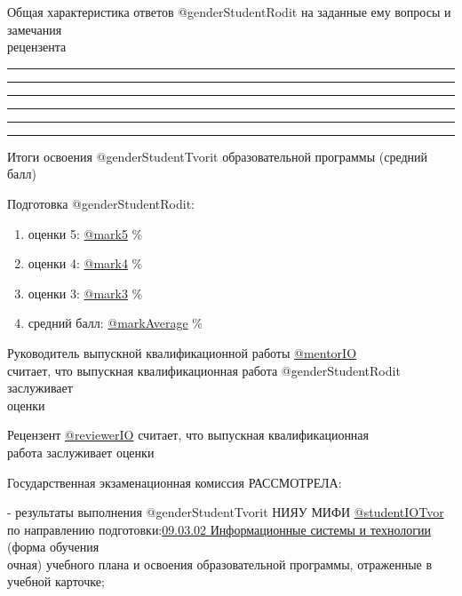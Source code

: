 \documentclass[a4paper,12pt]{article} %
\begin{document}
	Общая характеристика ответов @genderStudentRodit на заданные ему вопросы и замечания\\ рецензента  
	\vspace{0.4cm}
	\smallskip\hrule
	\vspace{0.4cm} 
	\smallskip\hrule
	\vspace{0.4cm} 
	\smallskip\hrule
	\vspace{0.4cm} 
	\smallskip\hrule
	\vspace{0.4cm} 
	\smallskip\hrule
	\vspace{0.4cm} 
	\smallskip\hrule
	\vspace{0.4cm} 

\par\medskip
Итоги освоения @genderStudentTvorit образовательной программы (средний балл)

Подготовка @genderStudentRodit:
\vspace{-0.2cm}
\begin{enumerate}
	\item оценки 5: \underline{@mark5} \%
	\vspace{-0.35cm}
	\item оценки 4: \underline{@mark4} \%
	\vspace{-0.35cm}
	\item оценки 3: \underline{@mark3} \%
	\vspace{-0.35cm}
	\item средний балл: \underline{@markAverage} \%
	\vspace{-0.35cm}
\end{enumerate}
\par\bigskip
Руководитель выпускной квалификационной работы 
\underline{@mentorIO}\\
считает, что выпускная квалификационная работа @genderStudentRodit заслуживает \\
оценки  \makebox[10mm]{\hrulefill}\makebox[10mm]{\hrulefill}\makebox[10mm]{\hrulefill}
\par\medskip
Рецензент \underline{@reviewerIO} считает, что выпускная квалификационная\\ работа заслуживает оценки \makebox[10mm]{\hrulefill}\makebox[10mm]{\hrulefill}\makebox[10mm]{\hrulefill}
\par\medskip

Государственная экзаменационная комиссия РАССМОТРЕЛА:

- результаты выполнения @genderStudentTvorit НИЯУ МИФИ \underline{@studentIOTvor}\\
 по направлению подготовки:\underline{09.03.02 Информационные системы и технологии}  (форма обучения\\
  очная) учебного плана и освоения образовательной программы, отраженные в учебной карточке;
\end{document}

